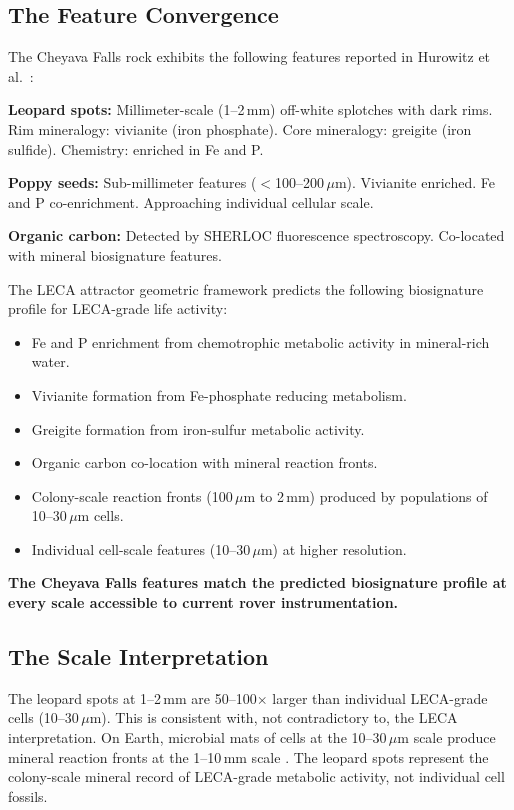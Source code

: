\documentclass[11pt, a4paper]{article}
\begin{document}
\subsection{The Feature Convergence}

The Cheyava Falls rock exhibits the following features
reported in Hurowitz et al.\ \cite{hurowitz2025}:

\textbf{Leopard spots:} Millimeter-scale (1--2\,mm)
off-white splotches with dark rims. Rim mineralogy:
vivianite (iron phosphate). Core mineralogy: greigite
(iron sulfide). Chemistry: enriched in Fe and P.

\textbf{Poppy seeds:} Sub-millimeter features
($<$100--200\,$\mu$m). Vivianite enriched. Fe and P
co-enrichment. Approaching individual cellular scale.

\textbf{Organic carbon:} Detected by SHERLOC
fluorescence spectroscopy. Co-located with mineral
biosignature features.

The LECA attractor geometric framework predicts
the following biosignature profile for LECA-grade
life activity:

\begin{itemize}[leftmargin=*]
\item Fe and P enrichment from chemotrophic metabolic
  activity in mineral-rich water.
\item Vivianite formation from Fe-phosphate reducing
  metabolism.
\item Greigite formation from iron-sulfur metabolic
  activity.
\item Organic carbon co-location with mineral reaction
  fronts.
\item Colony-scale reaction fronts (100\,$\mu$m to 2\,mm)
  produced by populations of 10--30\,$\mu$m cells.
\item Individual cell-scale features (10--30\,$\mu$m)
  at higher resolution.
\end{itemize}

\textbf{The Cheyava Falls features match the predicted
biosignature profile at every scale accessible to
current rover instrumentation.}

\subsection{The Scale Interpretation}

The leopard spots at 1--2\,mm are 50--100$\times$ larger
than individual LECA-grade cells (10--30\,$\mu$m). This
is consistent with, not contradictory to, the LECA
interpretation. On Earth, microbial mats of cells at
the 10--30\,$\mu$m scale produce mineral reaction fronts
at the 1--10\,mm scale \cite{nealson1997}. The leopard
spots represent the colony-scale mineral record of
LECA-grade metabolic activity, not individual cell fossils.
\end{document}
